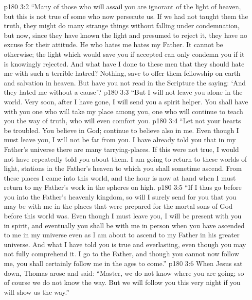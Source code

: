 \vs p180 3:2 \textcolor{ubdarkred}{“Many of those who will assail you are ignorant of the light of heaven, but this is not true of some who now persecute us. If we had not taught them the truth, they might do many strange things without falling under condemnation, but now, since they have known the light and presumed to reject it, they have no excuse for their attitude. He who hates me hates my Father. It cannot be otherwise; the light which would save you if accepted can only condemn you if it is knowingly rejected. And what have I done to these men that they should hate me with such a terrible hatred? Nothing, save to offer them fellowship on earth and salvation in heaven. But have you not read in the Scripture the saying: ‘And they hated me without a cause’?}
\vs p180 3:3 \textcolor{ubdarkred}{“But I will not leave you alone in the world. Very soon, after I have gone, I will send you a spirit helper. You shall have with you one who will take my place among you, one who will continue to teach you the way of truth, who will even comfort you.}
\vs p180 3:4 “Let not your hearts be troubled. You believe in God; continue to believe also in me. Even though I must leave you, I will not be far from you. I have already told you that in my Father’s universe there are many tarrying\hyp{}places. If this were not true, I would not have repeatedly told you about them. I am going to return to these worlds of light, stations in the Father’s heaven to which you shall sometime ascend. From these places I came into this world, and the hour is now at hand when I must return to my Father’s work in the spheres on high.
\vs p180 3:5 \textcolor{ubdarkred}{“If I thus go before you into the Father’s heavenly kingdom, so will I surely send for you that you may be with me in the places that were prepared for the mortal sons of God before this world was. Even though I must leave you, I will be present with you in spirit, and eventually you shall be with me in person when you have ascended to me in my universe even as I am about to ascend to my Father in his greater universe. And what I have told you is true and everlasting, even though you may not fully comprehend it. I go to the Father, and though you cannot now follow me, you shall certainly follow me in the ages to come.”}
\vs p180 3:6 When Jesus sat down, Thomas arose and said: “Master, we do not know where you are going; so of course we do not know the way. But we will follow you this very night if you will show us the way.”
